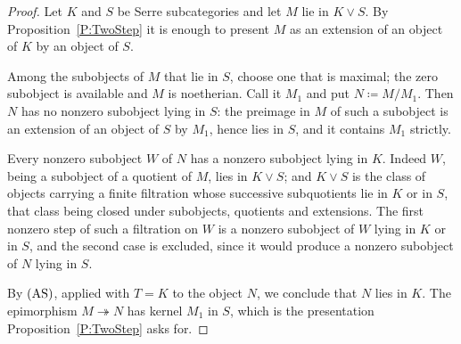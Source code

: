 \documentclass[reqno,a4paper]{amsart}
\numberwithin{equation}{section}
\theoremstyle{plain}
\theoremstyle{definition}
\def\nameit#1{\textrm{#1}~}
\def\prox{\nameit{Proposition}}
\renewcommand{\1}{\onecat{1}}
\newcommand{\AS}{\textup{(AS)}}
\newcommand{\toe}{\twoheadrightarrow}
\begin{document}
\begin{proof}
	Let \(K\) and \(S\) be Serre subcategories and let \(M\) lie in \(K\vee S\). By \prox\ref{P:TwoStep} it is enough to present \(M\) as an extension of an object of \(K\) by an object of \(S\).

	Among the subobjects of \(M\) that lie in \(S\), choose one that is maximal; the zero subobject is available and \(M\) is noetherian. Call it \(M_{1}\) and put \(N\coloneq M/M_{1}\). Then \(N\) has no nonzero subobject lying in \(S\): the preimage in \(M\) of such a subobject is an extension of an object of \(S\) by \(M_{1}\), hence lies in \(S\), and it contains \(M_{1}\) strictly.

	Every nonzero subobject \(W\) of \(N\) has a nonzero subobject lying in \(K\). Indeed \(W\), being a subobject of a quotient of \(M\), lies in \(K\vee S\); and \(K\vee S\) is the class of objects carrying a finite filtration whose successive subquotients lie in \(K\) or in \(S\), that class being closed under subobjects, quotients and extensions. The first nonzero step of such a filtration on \(W\) is a nonzero subobject of \(W\) lying in \(K\) or in \(S\), and the second case is excluded, since it would produce a nonzero subobject of \(N\) lying in \(S\).

	By \(\AS\), applied with \(T=K\) to the object \(N\), we conclude that \(N\) lies in \(K\). The epimorphism \(M\toe N\) has kernel \(M_{1}\) in \(S\), which is the presentation \prox\ref{P:TwoStep} asks for.
\end{proof}
\end{document}
